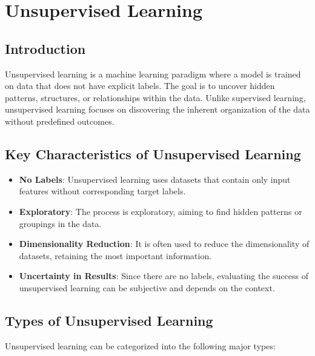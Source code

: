 \section{Unsupervised Learning}

\subsection*{Introduction}
Unsupervised learning is a machine learning paradigm where a model is trained on data that does not have explicit labels. The goal is to uncover hidden patterns, structures, or relationships within the data. Unlike supervised learning, unsupervised learning focuses on discovering the inherent organization of the data without predefined outcomes.

\subsection*{Key Characteristics of Unsupervised Learning}

\begin{itemize}
    \item \textbf{No Labels}: Unsupervised learning uses datasets that contain only input features without corresponding target labels.
    \item \textbf{Exploratory}: The process is exploratory, aiming to find hidden patterns or groupings in the data.
    \item \textbf{Dimensionality Reduction}: It is often used to reduce the dimensionality of datasets, retaining the most important information.
    \item \textbf{Uncertainty in Results}: Since there are no labels, evaluating the success of unsupervised learning can be subjective and depends on the context.
\end{itemize}

\subsection*{Types of Unsupervised Learning}

Unsupervised learning can be categorized into the following major types:

